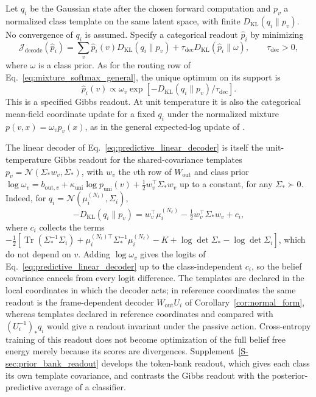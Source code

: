 \documentclass[twoside,11pt]{article}
\begin{document}
Let $q_i$ be the Gaussian state after the chosen forward computation and $p_v$ a normalized class template on the same latent space, with finite $D_{\mathrm{KL}}(q_i\|p_v)$. No convergence of $q_i$ is assumed. Specify a categorical readout $\hat p_i$ by minimizing
\begin{equation}
\mathcal J_{\mathrm{decode}}(\hat p_i)
=\sum_v\hat p_i(v)D_{\mathrm{KL}}(q_i\|p_v)
+\tau_{\mathrm{dec}}D_{\mathrm{KL}}(\hat p_i\|\omega),
\qquad\tau_{\mathrm{dec}}>0,
\label{eq:readout_objective}
\end{equation}
where $\omega$ is a class prior. As for the routing row of Eq.~\eqref{eq:mixture_softmax_general}, the unique optimum on its support is
\begin{equation}
\hat p_i(v)\propto\omega_v\exp\left[-D_{\mathrm{KL}}(q_i\|p_v)/\tau_{\mathrm{dec}}\right].
\label{eq:readout_gibbs}
\end{equation}
This is a specified Gibbs readout. At unit temperature it is also the categorical mean-field coordinate update for a fixed $q_i$ under the normalized mixture $p(v,x)=\omega_vp_v(x)$, as in the general expected-log update of \citet[arXiv version, \S2.4, Eqs.~17--18]{Blei2017}.

The linear decoder of Eq.~\eqref{eq:predictive_linear_decoder} is itself the unit-temperature Gibbs readout for the shared-covariance templates $p_v=\mathcal N(\Sigma_*w_v,\Sigma_*)$, with $w_v$ the $v$th row of $W_{\mathrm{out}}$ and class prior $\log\omega_v=b_{\mathrm{out},v}+\kappa_{\mathrm{uni}}\log p_{\mathrm{uni}}(v)+\tfrac12w_v^\top\Sigma_*w_v$ up to a constant, for any $\Sigma_*\succ0$. Indeed, for $q_i=\mathcal N(\mu_i^{(N_\ell)},\Sigma_i)$,
\begin{equation}
-D_{\mathrm{KL}}(q_i\|p_v)=w_v^\top\mu_i^{(N_\ell)}-\tfrac12w_v^\top\Sigma_*w_v+c_i,
\label{eq:decoder_gibbs_identity}
\end{equation}
where $c_i$ collects the terms $-\tfrac12[\operatorname{Tr}(\Sigma_*^{-1}\Sigma_i)+\mu_i^{(N_\ell)\top}\Sigma_*^{-1}\mu_i^{(N_\ell)}-K+\log\det\Sigma_*-\log\det\Sigma_i]$, which do not depend on $v$. Adding $\log\omega_v$ gives the logits of Eq.~\eqref{eq:predictive_linear_decoder} up to the class-independent $c_i$, so the belief covariance cancels from every logit difference. The templates are declared in the local coordinates in which the decoder acts; in reference coordinates the same readout is the frame-dependent decoder $W_{\mathrm{out}}U_i$ of Corollary~\ref{cor:normal_form}, whereas templates declared in reference coordinates and compared with $(U_i^{-1})_*q_i$ would give a readout invariant under the passive action. Cross-entropy training of this readout does not become optimization of the full belief free energy merely because its scores are divergences. Supplement~\ref{S-sec:prior_bank_readout} develops the token-bank readout, which gives each class its own template covariance, and contrasts the Gibbs readout with the posterior-predictive average of a classifier.
\end{document}
